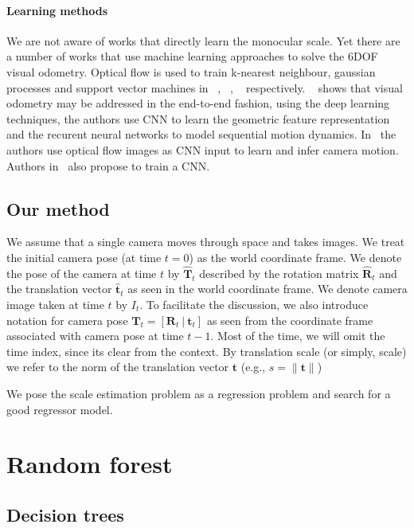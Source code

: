 \paragraph{Learning methods} We are not aware of works that directly
learn the monocular scale. Yet there are a number of works that use
machine learning approaches to solve the 6DOF visual odometry.
Optical flow is used to train k-nearest neighbour, gaussian processes
and support vector machines in ~\cite{roberts2008memory},
~\cite{guizilini2013semi}, ~\cite{CIARFUGLIA20141717}
respectively. ~\cite{wang2017deepvo} shows that visual odometry may be
addressed in the end-to-end fashion, using the deep learning
techniques, the authors use CNN to learn the geometric feature
representation and the recurent neural networks to model sequential
motion dynamics. In~\cite{muller2017flowdometry} the authors use
optical flow images as CNN input to learn and infer camera
motion. Authors in~\cite{DBLP:journals/corr/MohantyADGSC16} also
propose to train a CNN.



\subsection{Our method}

We assume that a single camera moves through space and takes images.
We treat the initial camera pose (at time $t=0$) as the world
coordinate frame.  We denote the pose of the camera at time $t$ by
$\mathbf{\hat{T}}_t$ described by the rotation matrix
$\mathbf{\hat{R}}_t$ and the translation vector $\mathbf{\hat{t}}_t$
as seen in the world coordinate frame.  We denote camera image taken
at time $t$ by $I_t$.  To facilitate the discussion, we also introduce
notation for camera pose
$\mathbf{T}_t = [\mathbf{R}_t\ |\ \mathbf{t}_t] $ as seen from the
coordinate frame associated with camera pose at time $t-1$.  Most of
the time, we will omit the time index, since its clear from the
context.  By translation scale (or simply, scale) we refer to the norm
of the translation vector $\mathbf{t}$ (e.g.,
$s = \lVert \mathbf{t} \rVert$)

We pose the scale estimation problem as a regression problem and
search for a good regressor model.

\section{Random forest}

\subsection{Decision trees}

